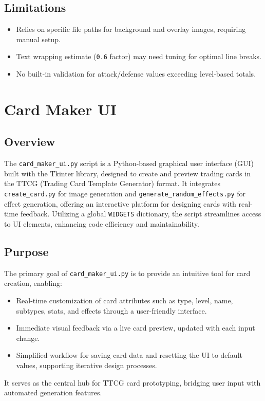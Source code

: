 \subsection{Limitations}
\begin{itemize}
	\item Relies on specific file paths for background and overlay images, requiring manual setup.
	\item Text wrapping estimate (\texttt{0.6} factor) may need tuning for optimal line breaks.
	\item No built-in validation for attack/defense values exceeding level-based totals.
\end{itemize}

















\section{Card Maker UI}
\label{sec:card_maker_ui}

\subsection{Overview}
The \texttt{card\_maker\_ui.py} script is a Python-based graphical user interface (GUI) built with the Tkinter library, designed to create and preview trading cards in the TTCG (Trading Card Template Generator) format. It integrates \texttt{create\_card.py} for image generation and \texttt{generate\_random\_effects.py} for effect generation, offering an interactive platform for designing cards with real-time feedback. Utilizing a global \texttt{WIDGETS} dictionary, the script streamlines access to UI elements, enhancing code efficiency and maintainability.

\subsection{Purpose}
The primary goal of \texttt{card\_maker\_ui.py} is to provide an intuitive tool for card creation, enabling:
\begin{itemize}
	\item Real-time customization of card attributes such as type, level, name, subtypes, stats, and effects through a user-friendly interface.
	\item Immediate visual feedback via a live card preview, updated with each input change.
	\item Simplified workflow for saving card data and resetting the UI to default values, supporting iterative design processes.
\end{itemize}
It serves as the central hub for TTCG card prototyping, bridging user input with automated generation features.

